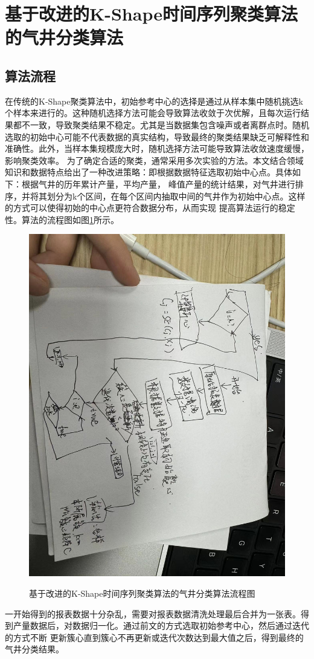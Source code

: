 \section{基于改进的K-Shape时间序列聚类算法的气井分类算法}
\subsection{算法流程}
在传统的K-Shape聚类算法中，初始参考中心的选择是通过从样本集中随机挑选k个样本来进行的。这种随机选择方法可能会导致算法收敛于次优解，且每次运行结果都不一致，导致聚类结果不稳定。尤其是当数据集包含噪声或者离群点时。随机选取的初始中心可能不代表数据的真实结构，导致最终的聚类结果缺乏可解释性和准确性。此外，当样本集规模庞大时，随机选择方法可能导致算法收敛速度缓慢，影响聚类效率。
为了确定合适的聚类，通常采用多次实验的方法。本文结合领域知识和数据特点给出了一种改进策略：即根据数据特征选取初始中心点。具体如下：根据气井的历年累计产量，平均产量，
峰值产量的统计结果，对气井进行排序，并将其划分为k个区间，在每个区间内抽取中间的气井作为初始中心点。这样的方式可以使得初始的中心点更符合数据分布，从而实现
提高算法运行的稳定性。算法的流程图如图\ref{fig:K-Shape}所示。
\begin{figure}
    \centering
    \includegraphics[scale=0.3,angle=0]{figure/K-Shape.jpg}\\
    \caption{基于改进的K-Shape时间序列聚类算法的气井分类算法流程图}
    \label{fig:K-Shape}
\end{figure}
一开始得到的报表数据十分杂乱，需要对报表数据清洗处理最后合并为一张表。得到产量数据后，对数据归一化。通过前文的方式选取初始参考中心，然后通过迭代的方式不断
更新簇心直到簇心不再更新或迭代次数达到最大值之后，得到最终的气井分类结果。